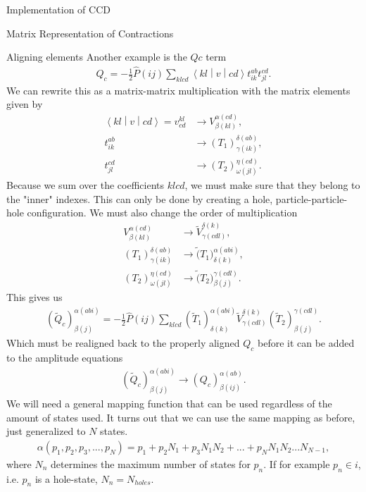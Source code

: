 \documentclass[twoside,english]{uiofysmaster}
\begin{document}
\begin{chapter}{Implementation of CCD}
\begin{section}{Matrix Representation of Contractions}
\begin{subsection}{Aligning elements}
			Another example is the $Qc$ term
			\begin{align}
				Q_c = -\frac{1}{2} \hat P(ij) \sum_{klcd} \left< kl \middle| v \middle| cd \right> t_{ik}^{ab} t_{jl}^{cd}.
			\end{align}
			We can rewrite this as a matrix-matrix multiplication with the matrix elements given by
			\begin{align}
				\left< kl \middle| v \middle| cd \right> = v_{cd}^{kl} & \rightarrow V^{\alpha(cd)}_{\beta(kl)}, \\
				t_{ik}^{ab} & \rightarrow (T_1)_{\gamma(ik)}^{\delta(ab)}, \\
				t_{jl}^{cd} & \rightarrow (T_2)_{\omega(jl)}^{\eta(cd)}.
			\end{align}
			Because we sum over the coefficients $klcd$, we must make sure that they belong to the "inner" indexes. This can only be done by creating a hole, particle-particle-hole configuration. We must also change the order of multiplication
			\begin{align}
				V^{\alpha(cd)}_{\beta(kl)} &  \rightarrow \tilde V^{\delta(k)}_{\gamma(cdl)}, \\
				(T_1)_{\gamma(ik)}^{\delta(ab)} & \rightarrow \tilde (T_1)^{\alpha(abi)}_{\delta(k)}, \\
				(T_2)_{\omega(jl)}^{\eta(cd)} & \rightarrow \tilde (T_2)^{\gamma(cdl)}_{\beta(j)}.
			\end{align}
			This gives us
			\begin{align}
				( \tilde Q_c )_{\beta(j)}^{\alpha(abi)} = -\frac{1}{2} \hat P(ij) \sum_{klcd} (\tilde T_1)^{\alpha(abi)}_{\delta(k)} \tilde V^{\delta(k)}_{\gamma(cdl)} (\tilde T_2)^{\gamma(cdl)}_{\beta(j)}.
			\end{align}
			Which must be realigned back to the properly aligned $Q_c$ before it can be added to the amplitude equations
			\begin{align}
				( \tilde Q_c )_{\beta(j)}^{\alpha(abi)} \rightarrow (Q_c)_{\beta(ij)}^{\alpha(ab)}.
			\end{align}
			We will need a general mapping function that can be used regardless of the amount of states used. It turns out that we can use the same mapping as before, just generalized to $N$ states.
			\begin{align}
				\alpha(p_1,p_2,p_3,...,p_N) = p_1 + p_2N_1 + p_3N_1N_2 + ... + p_N N_1 N_2 ... N_{N-1},
			\end{align}
			where $N_n$ determines the maximum number of states for $p_n$. If for example $p_n \in i$, i.e. $p_n$ is a hole-state, $N_n = N_{holes}$.


\end{subsection}
\end{section}
\end{chapter}
\end{document}
